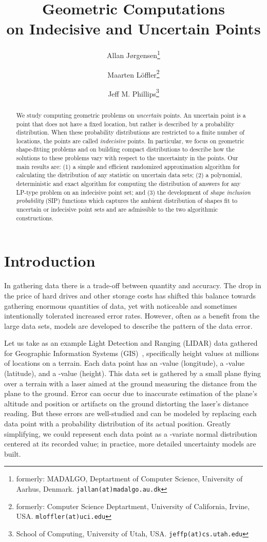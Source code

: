 \documentclass{journal}
\title{Geometric Computations\\ on Indecisive and Uncertain Points 
}
\author{
  Allan J{\o}rgensen\thanks
  { formerly: MADALGO, Deptartment of Computer Science, University of Aarhus, Denmark.
    \texttt{jallan(at)madalgo.au.dk}
  }
  \and
  Maarten L\"offler\thanks
  {
    formerly: Computer Science Deptartment, University of California, Irvine, USA.
    \texttt{mloffler(at)uci.edu}
  }
  \and
  Jeff M. Phillips\thanks
  {
    School of Computing, University of Utah, USA.
    \texttt{jeffp(at)cs.utah.edu}
  }
}
\date{ }
\begin{document}
\maketitle

\begin{abstract}
We study computing geometric problems on \emph {uncertain} points. An uncertain point is a point that does not have a fixed location, but rather is described by a probability distribution.  When these probability distributions are restricted to a finite number of locations, the points are called \emph{indecisive} points.  In particular, we focus on geometric shape-fitting problems and on building compact distributions to describe how the solutions to these problems vary with respect to the uncertainty in the points.  Our main results are:
(1) a simple and efficient randomized approximation algorithm for calculating the distribution of any statistic on uncertain data sets;
(2) a polynomial, deterministic and exact algorithm for computing the distribution of answers for any LP-type problem on an indecisive point set; and
(3) the development of \emph{shape inclusion probability} (SIP) functions which captures the ambient distribution of shapes fit to uncertain or indecisive point sets and are admissible to the two algorithmic constructions.  
\end{abstract}








\section {Introduction}

In gathering data there is a trade-off between quantity and accuracy.  The drop in the price of hard drives and other storage costs has shifted this balance towards gathering enormous quantities of data, yet with noticeable and sometimes intentionally tolerated increased error rates.  However, often as a benefit from the large data sets, models are developed to describe the pattern of the data error.



Let us take as an example Light Detection and Ranging (LIDAR) data gathered for Geographic Information Systems (GIS)~\cite{LKC04}, specifically height values at millions of locations on a terrain.
Each data point  has an -value (longitude), a -value (latitude), and a -value (height).
This data set is gathered by a small plane flying over a terrain with a laser aimed at the ground measuring the distance from the plane to the ground.  Error can occur due to inaccurate estimation of the plane's altitude and position or artifacts on the ground distorting the laser's distance reading.
But these errors are well-studied and can be modeled by replacing each data point with a probability distribution of its actual position.  Greatly simplifying, we could represent each data point as a -variate normal distribution centered at its recorded value; in practice, more detailed uncertainty models are built.
\end{document}
